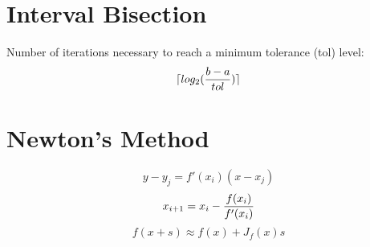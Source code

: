 \section{Interval Bisection}
Number of iterations necessary to reach a minimum tolerance (tol) level:
\begin{equation}
\lceil log_2({{b-a}\over {tol}})\rceil
\end{equation}

\section{Newton's Method}
\begin{equation}
y-y_j=f'(x_i)(x-x_j)
\end{equation}
\begin{equation}
x_{i+1}=x_i-{f(x_i)\over f'(x_i)}
\end{equation}
\begin{equation}
f(x+ s) \approx f( x)+J_f(x)s
\end{equation}

